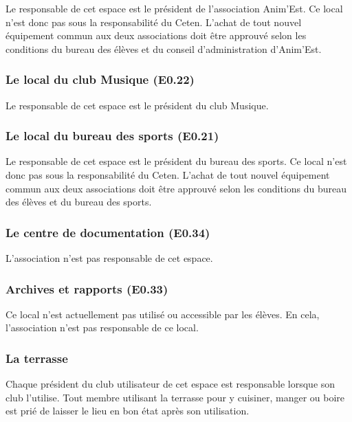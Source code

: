 \documentclass{article} %
\begin{document}
				Le responsable de cet espace est le président de l’association
				Anim’Est. Ce local n’est donc pas sous la responsabilité du
				Ceten. L’achat de tout nouvel équipement commun aux deux
				associations doit être approuvé selon les conditions du bureau
				des élèves et du conseil d'administration d’Anim’Est.

			\subsubsection{Le local du club Musique (E0.22)}
\label{ssub:le_local_du_club_musique_e0_22_}

				Le responsable de cet espace est le président du club Musique.

			\subsubsection{Le local du bureau des sports (E0.21)}
\label{ssub:le_local_bureau_des_sports_e0_21_}

				Le responsable de cet espace est le président du bureau des
				sports. Ce local n’est donc pas sous la responsabilité du
				Ceten. L’achat de tout nouvel équipement commun aux deux
				associations doit être approuvé selon les conditions du bureau
				des élèves et du bureau des sports.

			\subsubsection{Le centre de documentation (E0.34)}
\label{ssub:le_centre_de_documentation_e0_34_}

				L’association n’est pas responsable de cet espace.

			\subsubsection{Archives et rapports (E0.33)}
\label{ssub:archives_et_rapports_e0_33_}

				Ce local n’est actuellement pas utilisé ou accessible par les
				élèves. En cela, l’association n’est pas responsable de ce
				local.

			\subsubsection{La terrasse}
\label{ssub:la_terrasse}

				Chaque président du club utilisateur de cet espace est
				responsable lorsque son club l’utilise. Tout membre utilisant
				la terrasse pour y cuisiner, manger ou boire est prié de
				laisser le lieu en bon état après son utilisation.
\end{document}
